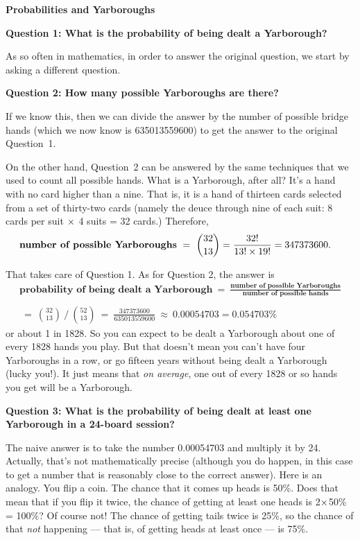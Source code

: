 

\textbf{\LARGE Probabilities and Yarboroughs}

\textbf{Question 1: What is the probability of being dealt a 
Yarborough?}

As so often in mathematics, in order to answer the original question, 
we start by asking a different question.

\textbf{Question 2: How many possible Yarboroughs are there?}

If we know this, then we can divide the answer by the number of possible 
bridge hands (which we now know is 635013559600) to get the answer to 
the original Question~1.

On the other hand, Question~2 can be answered by the same techniques 
that we used to count all possible hands.  What is a Yarborough, after 
all?  It's a hand with no card higher than a nine.  That is, it is a 
hand of thirteen cards selected from a set of thirty-two cards (namely 
the deuce through nine of each suit: 8 cards per suit $\times$ 4 suits = 32 
cards.)  Therefore,
 \boldmath
 \begin{align*}
 \textbf{number of possible Yarboroughs} &~=~ \binom{32}{13} = 
 \frac{32!}{13!\times19!} = 347373600.
 \end{align*}
 \unboldmath

That takes care of Question 1.  As for Question 2, the answer is
 \boldmath
 \begin{multline*}
 \textbf{probability of being dealt a Yarborough} ~=~ 
 \frac{\textbf{number of possible Yarboroughs}}{\textbf{number of 
 possible hands}}\\\\
 ~=~ \binom{32}{13} ~/~ \binom{52}{13} ~=~ 
 \frac{347373600}{635013559600} ~\approx~ 0.00054703 = 0.054703\%
 \end{multline*}
 \unboldmath
or about 1 in 1828.  So you can expect to be dealt a Yarborough about 
one of every 1828 hands you play. But that doesn't mean you can't have 
four Yarboroughs in a row, or go fifteen years without being dealt a 
Yarborough (lucky you!).  It just means that \emph{on average}, one out 
of every 1828 or so hands you get will be a Yarborough.

\textbf{Question 3: What is the probability of being dealt at least one 
Yarborough in a 24-board session?}

The naive answer is to take the number 0.00054703 and multiply it by 24.  
Actually, that's not mathematically precise (although you do happen, in 
this case to get a number that is reasonably close to the correct 
answer).  Here is an analogy.  You flip a coin.  The chance that it 
comes up heads is 50\%.  Does that mean that if you flip it twice, the 
chance of getting at least one heads is 2$\times$50\% = 100\%?  Of course 
not!  The chance of getting tails twice is 25\%, so the chance of that 
\emph{not} happening --- that is, of getting heads at least once --- is 
75\%.

